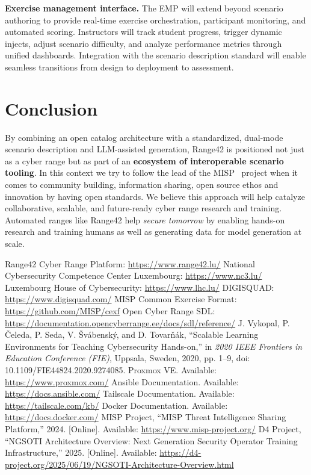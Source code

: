 \documentclass[11pt]{article}
\begin{document}
\textbf{Exercise management interface.}
The EMP will extend beyond scenario authoring to provide real-time exercise orchestration, participant monitoring, and automated scoring.
Instructors will track student progress, trigger dynamic injects, adjust scenario difficulty, and analyze performance metrics through unified dashboards.
Integration with the scenario description standard will enable seamless transitions from design to deployment to assessment.


\section{Conclusion}
By combining an open catalog architecture with a standardized, dual-mode scenario description and LLM-assisted generation, Range42 is positioned not just as a cyber range but as part of an \textbf{ecosystem of interoperable scenario tooling}. In this context we try to follow the lead of the MISP~\cite{misp} project when it comes to community building, information sharing, open source ethos and innovation by having open standards.
We believe this approach will help catalyze collaborative, scalable, and future-ready cyber range research and training.
Automated ranges like Range42 help \emph{secure tomorrow} by enabling hands-on research and training humans as well as generating data for model generation at scale.


\begin{thebibliography}{99}
 Range42 Cyber Range Platform: \url{https://www.range42.lu/}
 National Cybersecurity Competence Center Luxembourg: \url{https://www.nc3.lu/}
 Luxembourg House of Cybersecurity: \url{https://www.lhc.lu/}
 DIGISQUAD: \url{https://www.digisquad.com/}
 MISP Common Exercise Format: \url{https://github.com/MISP/cexf}
 Open Cyber Range SDL: \url{https://documentation.opencyberrange.ee/docs/sdl/reference/}
 J. Vykopal, P. Čeleda, P. Seda, V. Švábenský, and D. Tovarňák, 
``Scalable Learning Environments for Teaching Cybersecurity Hands-on,'' 
in \textit{2020 IEEE Frontiers in Education Conference (FIE)}, 
Uppsala, Sweden, 2020, pp. 1--9, doi: 10.1109/FIE44824.2020.9274085.
 Proxmox VE. Available: \url{https://www.proxmox.com/}
 Ansible Documentation. Available: \url{https://docs.ansible.com/}
 Tailscale Documentation. Available: \url{https://tailscale.com/kb/}
 Docker Documentation. Available: \url{https://docs.docker.com/}
 MISP Project, ``MISP Threat Intelligence Sharing Platform,'' 2024. [Online]. Available: \url{https://www.misp-project.org/}
 D4 Project, ``NGSOTI Architecture Overview: Next Generation Security Operator Training Infrastructure,'' 2025. [Online]. Available: \url{https://d4-project.org/2025/06/19/NGSOTI-Architecture-Overview.html}
\end{thebibliography}
\end{document}
